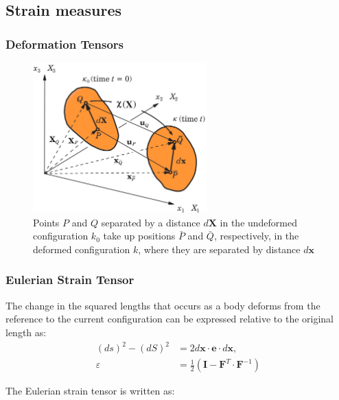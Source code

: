 \documentclass[notes]{beamer}
\begin{document}
\subsection{Strain measures}
\begin{frame}
\frametitle{Deformation Tensors}

\begin{figure}
	\includegraphics[width=0.6\textwidth]{figs/green-strain.png}
	\caption*{Points $P$ and $Q$ separated by a distance $d\mathbf{X}$ in the undeformed configuration $k_0$ take up positions $\bar{P}$ and $\bar{Q}$, respectively, in the deformed configuration $k$, where they are separated by distance $d\mathbf{x}$}
\end{figure}
\end{frame}

\begin{frame}
\frametitle{Eulerian Strain Tensor}

The change in the squared lengths that occurs as a body deforms from the reference to the current configuration can be expressed relative to the original length as:
	\begin{align*}
	(ds)^2  - (dS)^2 & = 2 d\mathbf{x} \cdot \mathbf{e} \cdot d\mathbf{x}, \\
	\varepsilon & = \frac{1}{2}(\mathbf{I} - \mathbf{F}^T \cdot \mathbf{F}^{-1})
	\end{align*}

The Eulerian strain tensor is written as:

\end{frame}
\end{document}
